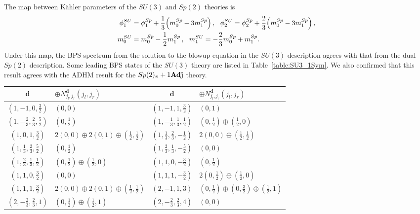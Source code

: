 The map between  K\"ahler parameters  of the $SU(3)$ and $Sp(2)$ theories is
\begin{align}
\phi_1^{SU} &= \phi_1^{Sp} + \frac{1}{3} \qty(m_0^{Sp} - 3m_1^{Sp}) \,, \ \ \phi_2^{SU} = \phi_2^{Sp} + \frac{2}{3} \qty(m_0^{Sp} - 3m_1^{Sp}) \,,\nonumber \\
m_0^{SU} &= m_0^{Sp} - \frac{1}{2} m_1^{Sp} \,, \ \ m_1^{SU} = -\frac{2}{3} m_0^{Sp} + m_1^{Sp}.
\end{align}
Under this map, the BPS spectrum from the solution to the blowup equation in the $SU(3)$ description agrees with that from the dual $Sp(2)$ description. Some leading BPS states of the $SU(3)$ theory are listed in Table~\ref{table:SU3_1Sym}. We also confirmed that this result agrees with the ADHM result for the $Sp(2)_\pi + 1{\bf Adj}$ theory.
\begin{table}
	\centering
	\begin{tabular}{|c|C{23ex}||c|C{23ex}|} \hline
		$ \mathbf{d} $ & $ \oplus N_{j_l, j_r}^{\mathbf{d}} (j_l, j_r) $ & $ \mathbf{d} $ & $ \oplus N_{j_l, j_r}^{\mathbf{d}} (j_l, j_r) $ \\ \hline
		$ (1, -1, 0, \frac{3}{2}) $ & $ (0, 0) $ & $ (1, -1, 1, \frac{3}{2}) $ & $ (0, 1) $ \\ \hline
		$ (1, -\frac{2}{3}, \frac{2}{3}, \frac{5}{2}) $ & $ (0, \frac{1}{2}) $ & $ (1, -\frac{1}{3}, \frac{1}{3}, \frac{1}{2}) $ & $ (0,\frac{1}{2}) \oplus (\frac{1}{2},0) $ \\ \hline
		$ (1, 0, 1, \frac{3}{2}) $ & $ 2(0,0) \oplus 2(0,1) \oplus (\frac{1}{2},\frac{1}{2}) $ & $ (1, \frac{1}{3}, \frac{2}{3}, -\frac{1}{2}) $ & $ 2(0,0) \oplus (\frac{1}{2},\frac{1}{2}) $ \\ \hline
		$ (1, \frac{1}{3}, \frac{2}{3}, \frac{5}{2}) $ & $ (0, \frac{1}{2}) $ & $ (1, \frac{2}{3}, \frac{1}{3}, -\frac{5}{2}) $ & $ (0, 0) $ \\ \hline
		$ (1, \frac{2}{3}, \frac{1}{3}, \frac{1}{2}) $ & $ (0,\frac{1}{2}) \oplus (\frac{1}{2},0) $ & $ (1, 1, 0, -\frac{3}{2}) $ & $ (0, \frac{1}{2}) $ \\ \hline
		$ (1, 1, 0, \frac{3}{2}) $ & $ (0, 0) $ & $ (1, 1, 1, -\frac{3}{2}) $ & $ 2(0,\frac{1}{2}) \oplus (\frac{1}{2},0) $ \\ \hline
		$ (1, 1, 1, \frac{3}{2}) $ & $ 2(0,0) \oplus 2(0,1) \oplus (\frac{1}{2},\frac{1}{2}) $ & $ (2, -1, 1, 3) $ & $ (0, \frac{1}{2}) \oplus (0, \frac{3}{2}) \oplus (\frac{1}{2}, 1) $ \\ \hline
		$ (2, -\frac{2}{3}, \frac{2}{3}, 1) $ & $ (0, \frac{1}{2}) \oplus (\frac{1}{2}, 1) $ & $ (2, -\frac{2}{3}, \frac{2}{3}, 4) $ & $ (0, 0) $ \\ \hline

\end{tabular}
\end{table}
